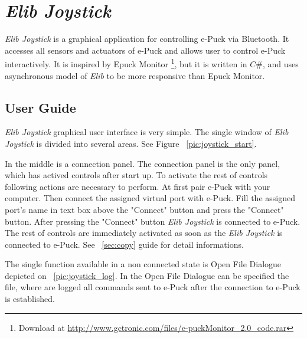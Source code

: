\chapter{{\it Elib Joystick}} \label{app:joystick}
	{\it Elib Joystick} is a graphical application for controlling e-Puck via Bluetooth.
	It accesses all sensors and actuators of e-Puck and allows user to control e-Puck interactively.
	It is inspired by Epuck Monitor 
	\footnote{\small{Download at \url{http://www.gctronic.com/files/e-puckMonitor_2.0_code.rar}}},
	but it is written in $C\#$, and uses asynchronous model
	of {\it Elib} to be more responsive than Epuck Monitor.

	\section{User Guide} \label{sec:joyguide}
	{\it Elib Joystick} graphical user interface is very simple. The single window of {\it Elib Joystick} 
	is divided into several areas.
	See Figure ~\ref{pic:joystick_start}.
	

	In the middle is a connection panel. The connection panel is the only panel, which 
	has actived controls after start up. To activate the rest of controls following actions are necessary to
	perform. At first pair e-Puck with your computer. Then connect the assigned virtual port with e-Puck.
	Fill the assigned port's name in text box above the "Connect" button and press
	the "Connect" button. After pressing the "Connect" button {\it Elib Joystick} is connected to e-Puck. 
	The rest of controls are immediately activated
	as soon as the {\it Elib Joystick} is connected to e-Puck.
	See ~\ref{sec:copy} guide for detail informations. 
	
	
	The single function available in a non connected state
	is Open File Dialogue depicted on ~\ref{pic:joystick_log}.
	In the  Open File Dialogue can be specified the file, 
	where are logged all commands sent to e-Puck after the connection
	to e-Puck is established.

